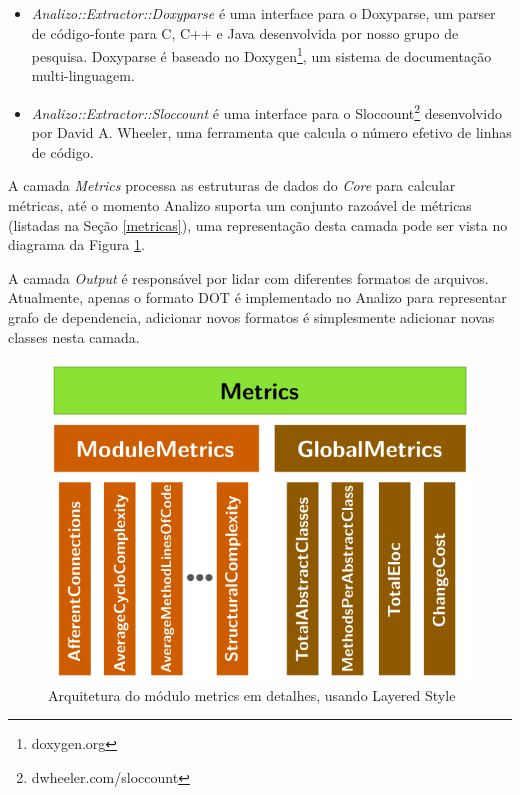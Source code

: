\begin{itemize}

  \item {\it Analizo::Extractor::Doxyparse} é uma interface para o Doxyparse,
  um parser de código-fonte para C, C++ e Java desenvolvida por nosso grupo de
  pesquisa\cite{Costa2009}. Doxyparse é baseado no
  Doxygen\footnote{doxygen.org}, um sistema de documentação multi-linguagem.

  \item {\it Analizo::Extractor::Sloccount} é uma interface para o
  Sloccount\footnote{dwheeler.com/sloccount} desenvolvido por David A. Wheeler,
  uma ferramenta que calcula o número efetivo de linhas de código.

\end{itemize}

A camada {\it Metrics} processa as estruturas de dados do {\it Core} para
calcular métricas, até o momento Analizo suporta um conjunto razoável de
métricas (listadas na Seção \ref{metricas}), uma representação desta camada
pode ser vista no diagrama da Figura \ref{arquitetura-metrics-analizo}.

A camada {\it Output} é responsável por lidar com diferentes formatos de
arquivos.  Atualmente, apenas o formato DOT é implementado no Analizo para
representar grafo de dependencia, adicionar novos formatos é simplesmente
adicionar novas classes nesta camada.

\begin{figure}[H]
\center
\includegraphics[scale=0.4]{imagens/analizo-metrics-architecture.png}
\caption{Arquitetura do módulo metrics em detalhes, usando Layered Style \cite{Clements2002}}
\label{arquitetura-metrics-analizo}
\end{figure}

